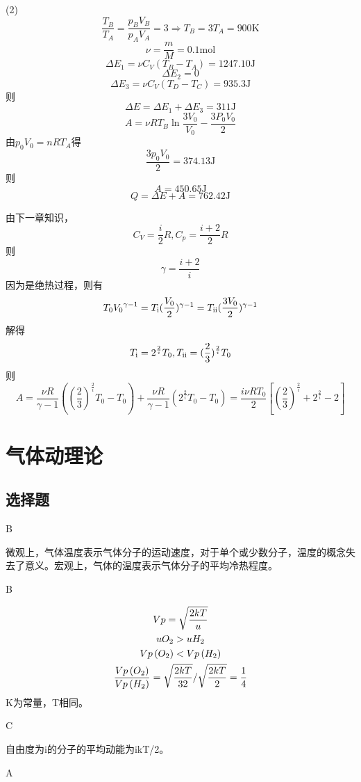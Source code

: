 \documentclass[b5paper,opensource]{./template/qyxf-book}
\newcommand{\RNum}[1]{\uppercase\expandafter{\romannumeral #1\relax}}%
\begin{document}
(2)
\[\frac{{{T_B}}}{{{T_A}}} = \frac{{{p_B}{V_B}}}{{{p_A}{V_A}}} = 3 \Rightarrow {T_B} = 3{T_A} = 900\mathrm{K}\]
\[\nu  = \frac{m}{M} = 0.1\mathrm{mol}\]
\[\Delta {E_1} = \nu {C_V}({T_B} - {T_A}) = 1247.10\mathrm{J}\]
\[\Delta {E_2} = 0\]
\[\Delta {E_3} = \nu {C_V}({T_D} - {T_C}) = 935.3\mathrm{J}\]
则\[\Delta E = \Delta {E_1} + \Delta {E_3} = 311\mathrm{J}\]
\[A = \nu R{T_B}\ln \frac{{3{V_0}}}{{{V_0}}} - \frac{{3P_0V_0}}{2}\]
由${p_0}{V_0} = nR{T_A}$得\[\frac{{3{p_0}{V_0}}}{2} = 374.13\mathrm{J}\]
则\[A = 450.65\mathrm{J}\]
\[Q = \Delta E + A = 762.42\mathrm{J}\]

\solve 由下一章知识，\[{C_V} = \frac{i}{2}R,{C_p} = \frac{{i + 2}}{2}R\]
则
\[\gamma=\frac{{i + 2}}{i}\]
因为是绝热过程，则有
\[{T_0}{V_0}^{\gamma-1}={T_\text{\RNum{1}}}{(\frac{V_0}{2})^{\gamma-1}}= {T_\text{\RNum{2}}}{(\frac{{3{V_0}}}{2})^{\gamma-1}}\]
解得
\[{T_\text{\RNum{1}}} = {2^{\frac{2}{i}}}{T_0},{T_\text{\RNum{2}}} = {(\frac{2}{3})^{\frac{2}{i}}}{T_0}\]
则
\[A = \frac{{\nu R}}{{\gamma-1}}({(\frac{2}{3})^{\frac{2}{i}}}{T_0} - {T_0}) + \frac{{\nu R}}{{\gamma  - 1}}({2^{\frac{2}{i}}}{T_0} - {T_0}) = \frac{{i\nu R{T_0}}}{2}[{(\frac{2}{3})^{\frac{2}{i}}} + {2^{\frac{2}{i}}} - 2]\]

\chapter{气体动理论}
\section{选择题}
B

\solve 微观上，气体温度表示气体分子的运动速度，对于单个或少数分子，温度的概念失去了意义。宏观上，气体的温度表示气体分子的平均冷热程度。

B

\solve
\begin{gather*} { V p = \sqrt { \frac { 2 k T } { u } } } \\
{ u O _ { 2 } > u H _ { 2 } } \\
{Vp\left(O_{ 2 } \right) < V p \left( H _ { 2 } \right) } \\
\frac{Vp\left(O_{ 2 } \right)}{Vp\left(H_{2}\right)}=\sqrt{\frac{2kT}{32}} \Huge/ \sqrt{\frac{2kT}{2}}=\frac{1}{4}
\end{gather*}
K为常量，T相同。

C

\solve 自由度为i的分子的平均动能为ikT/2。

A
\end{document}
